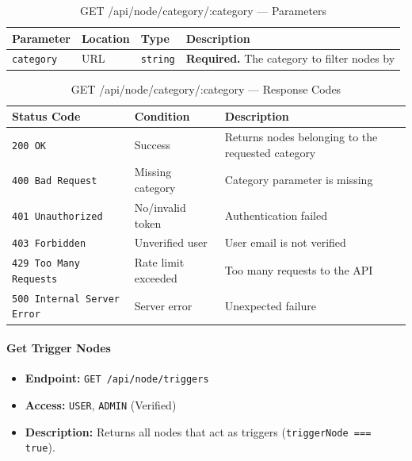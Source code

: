 \begin{table}[H]
\centering
\renewcommand{\arraystretch}{1.3}
\begin{tabularx}{\textwidth}{|l|l|l|X|}
\hline
\textbf{Parameter} & \textbf{Location} & \textbf{Type} & \textbf{Description} \\
\hline
\texttt{category}  & URL & \texttt{string}  & \textbf{Required.} The category to filter nodes by \\
\hline
\end{tabularx}
\caption{GET /api/node/category/:category — Parameters}
\label{tab:get-nodes-by-category-params}
\end{table}

\begin{table}[H]
\centering
\renewcommand{\arraystretch}{1.3}
\begin{tabularx}{\textwidth}{|l|l|X|}
\hline
\textbf{Status Code} & \textbf{Condition} & \textbf{Description} \\
\hline
\texttt{200 OK}           & Success          & Returns nodes belonging to the requested category \\
\hline
\texttt{400 Bad Request}  & Missing category & Category parameter is missing \\
\hline
\texttt{401 Unauthorized} & No/invalid token & Authentication failed \\
\hline
\texttt{403 Forbidden}    & Unverified user  & User email is not verified \\
\hline
\texttt{429 Too Many Requests} & Rate limit exceeded & Too many requests to the API \\
\hline
\texttt{500 Internal Server Error} & Server error & Unexpected failure \\
\hline
\end{tabularx}
\caption{GET /api/node/category/:category — Response Codes}
\label{tab:get-nodes-by-category-responses}
\end{table}
\FloatBarrier

\paragraph{Get Trigger Nodes}
\label{subsubsec:get-trigger-nodes}

\begin{itemize}
  \item \textbf{Endpoint:} \texttt{GET /api/node/triggers}
  \item \textbf{Access:} \texttt{USER}, \texttt{ADMIN} (Verified)
  \item \textbf{Description:} Returns all nodes that act as triggers (\texttt{triggerNode === true}).
\end{itemize}

